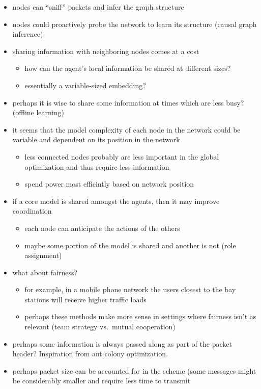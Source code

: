 \documentclass[11pt]{article}
\providecommand{\tightlist}{%
      \setlength{\itemsep}{0pt}\setlength{\parskip}{0pt}}
\begin{document}
\begin{itemize}
\tightlist
\item
  nodes can ``sniff'' packets and infer the graph structure
\item
  nodes could proactively probe the network to learn its structure
  (causal graph inference)
\item
  sharing information with neighboring nodes comes at a cost

  \begin{itemize}
  \tightlist
  \item
    how can the agent's local information be shared at different sizes?
  \item
    essentially a variable-sized embedding?
  \end{itemize}
\item
  perhaps it is wise to share some information at times which are less
  busy? (offline learning)
\item
  it seems that the model complexity of each node in the network could
  be variable and dependent on its position in the network

  \begin{itemize}
  \tightlist
  \item
    less connected nodes probably are less important in the global
    optimization and thus require less information
  \item
    spend power most efficintly based on network position
  \end{itemize}
\item
  if a core model is shared amongst the agents, then it may improve
  coordination

  \begin{itemize}
  \tightlist
  \item
    each node can anticipate the actions of the others
  \item
    maybe some portion of the model is shared and another is not (role
    assignment)
  \end{itemize}
\item
  what about fairness?

  \begin{itemize}
  \tightlist
  \item
    for example, in a mobile phone network the users closest to the bay
    stations will receive higher traffic loads
  \item
    perhaps these methods make more sense in settings where fairness
    isn't as relevant (team strategy vs.~mutual cooperation)
  \end{itemize}
  
\item
  perhaps some information is always passed along as part of the packet header?
  Inspiration from ant colony optimization.
  
\item
perhaps packet size can be accounted for in the scheme (some messages might be considerably smaller and require less time to transmit
  
\end{itemize}

    
    
    
    
\end{document}
